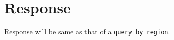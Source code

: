 \documentclass[a4paper, 10pt]{article}        %
\begin{document}
\section{Response}
Response will be same as that of a \texttt{query by region}.

\end{document}
